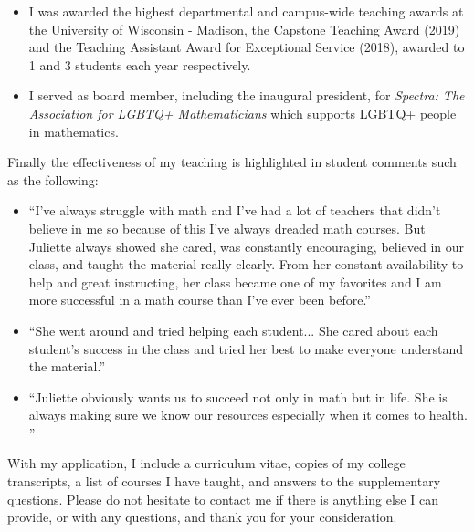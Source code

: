 \documentclass[11pt]{article}
\begin{document}
\begin{itemize}[leftmargin=*]
\item I was awarded the highest departmental and campus-wide teaching awards at the University of Wisconsin - Madison, the Capstone Teaching Award (2019) and the Teaching Assistant Award for Exceptional Service (2018), awarded to 1 and 3 students each year respectively. 
\item I served as board member, including the inaugural president, for \textit{Spectra: The Association for LGBTQ+ Mathematicians} which supports LGBTQ+ people in mathematics. 
\end{itemize}

Finally the effectiveness of my teaching is highlighted in student comments such as the following:
\begin{itemize}[leftmargin=*]
\item ``I’ve always struggle with math and I’ve had a lot of teachers that didn’t believe in me so because of this I’ve always dreaded math courses. But Juliette always showed she cared, was constantly encouraging, believed in our class, and taught the material really clearly. From her constant availability to help and great instructing, her class became one of my favorites and I am more successful in a math course than I’ve ever been before.''
\item ``She went around and tried helping each student... She cared about each student’s success in the class and tried her best to make everyone understand the material.''
\item ``Juliette obviously wants us to succeed not only in math but in life. She is always making sure we know our resources especially when it comes to health. ''
\end{itemize}

With my application, I include a curriculum vitae, copies of my college transcripts, a list of courses I have taught, and answers to the supplementary questions.  Please do not hesitate to contact me if there is anything else I can provide, or with any questions, and thank you for your consideration. 
\end{document}

